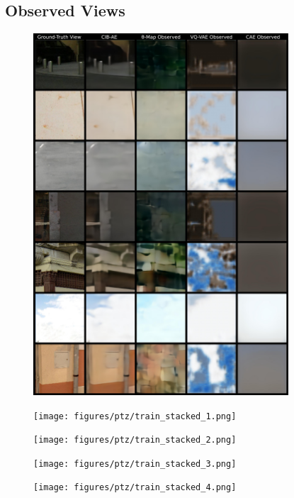 \begin{appendices}
\section{Observed Views} \label{sec:app-predictions-observed}
\begin{figure}[H]
    \centering
    \includegraphics[width=0.85\textwidth]{figures/ptz/train_stacked_0.png}
\end{figure}
\begin{figure}[H]
    \centering
    \texttt{[image: figures/ptz/train\_stacked\_1.png]}
\end{figure}
\begin{figure}[H]
    \centering
    \texttt{[image: figures/ptz/train\_stacked\_2.png]}
\end{figure}
\begin{figure}[H]
    \centering
    \texttt{[image: figures/ptz/train\_stacked\_3.png]}
\end{figure}
\begin{figure}[H]
    \centering
    \texttt{[image: figures/ptz/train\_stacked\_4.png]}
\end{figure}


\end{appendices}

